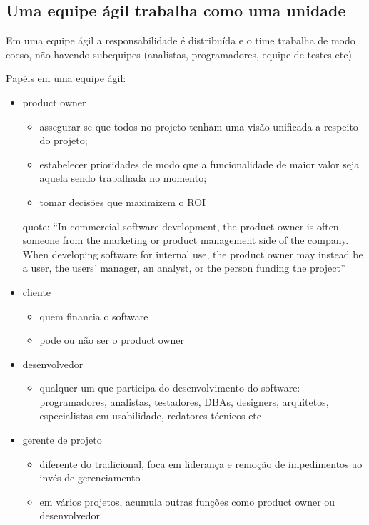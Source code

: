 \documentclass[a4paper,abntfigtabnum,noindentfirst]{abnt}
\begin{document}
\subsection{Uma equipe ágil trabalha como uma unidade}

Em uma equipe ágil a responsabilidade é distribuída e o time trabalha de modo coeso, não havendo subequipes (analistas, programadores, equipe de testes etc)

Papéis em uma equipe ágil:
\begin{itemize}

\item product owner
\begin{itemize}
\item assegurar-se que todos no projeto tenham uma visão unificada a respeito do projeto;
\item estabelecer prioridades de modo que a funcionalidade de maior valor seja aquela sendo trabalhada no momento;
\item tomar decisões que maximizem o ROI
\end{itemize}

quote:
``In commercial software development, the product owner is often someone from the marketing or product management side of the company. When developing software for internal use, the product owner may instead be a user, the users' manager, an analyst, or the person funding the project''

\item cliente
\begin{itemize}
\item quem financia o software
\item pode ou não ser o product owner
\end{itemize}

\item desenvolvedor
\begin{itemize}
\item qualquer um que participa do desenvolvimento do software: programadores, analistas, testadores, DBAs, designers, arquitetos, especialistas em usabilidade, redatores técnicos etc
\end{itemize}


\item gerente de projeto
\begin{itemize}
\item diferente do tradicional, foca em liderança e remoção de impedimentos ao invés de gerenciamento
\item em vários projetos, acumula outras funções como product owner ou desenvolvedor
\end{itemize}

\end{itemize}
\end{document}
